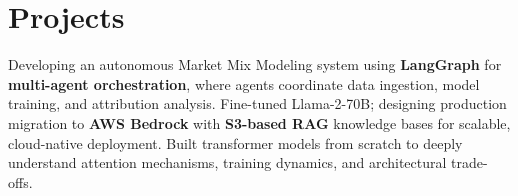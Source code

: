\section{Projects}
  \resumeSubHeadingListStart
    {Developing an autonomous Market Mix Modeling system using \textbf{LangGraph} for \textbf{multi-agent orchestration}, where agents coordinate data ingestion, model training, and attribution analysis. Fine-tuned Llama-2-70B; designing production migration to \textbf{AWS Bedrock} with \textbf{S3-based RAG} knowledge bases for scalable, cloud-native deployment.}
    {Built transformer models from scratch to deeply understand attention mechanisms, training dynamics, and architectural trade-offs.}
      
  \resumeSubHeadingListEnd
